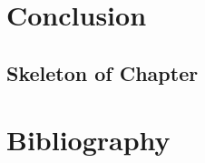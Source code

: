\documentclass[11pt,twoside,openright,titlepage]{ce}
\begin{document}
\chapter{Conclusion}
\begin{tcolorbox}
\section*{Skeleton of Chapter}

\end{tcolorbox}

\chapter{Bibliography}



\appendix
\end{document}
